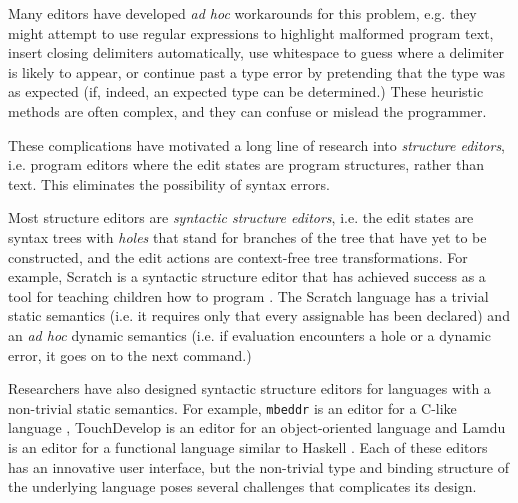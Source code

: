 Many editors have developed \emph{ad hoc} workarounds for this problem, e.g. they might attempt to use regular expressions to highlight malformed program text, insert closing delimiters automatically, use whitespace to guess where a delimiter is likely to appear, or continue past a type error by pretending that the type was as expected (if, indeed, an expected type can be determined.) These heuristic methods are often complex, and they can confuse or mislead the programmer. %


These complications have motivated a long line of research into \emph{structure editors}, i.e. program editors where the edit states are program structures, rather than text. This eliminates the possibility of syntax errors.

Most structure editors are \emph{syntactic structure editors}, i.e. the edit states are syntax trees with \emph{holes} that stand for branches of the tree that have yet to be constructed, and the edit actions are context-free tree transformations. For example, Scratch is a syntactic structure editor that has achieved success as a tool for teaching children how to program \cite{Resnick:2009:SP:1592761.1592779}. The Scratch language has a trivial static semantics (i.e. it requires only that every assignable has been declared) and an \emph{ad hoc} dynamic semantics (i.e. if evaluation encounters a hole or a dynamic error, it goes on to the next command.) 

Researchers have also designed syntactic structure editors for  languages with a non-trivial static semantics. For example, \texttt{mbeddr} is an editor for a C-like language \cite{voelter_mbeddr:_2012}, TouchDevelop is an editor for an object-oriented language \cite{tillmann_touchdevelop:_2011} and Lamdu is an editor for a functional language similar to Haskell \cite{lamdu}. Each of these editors has an innovative user interface, but the non-trivial type and binding structure of the underlying language poses several challenges that complicates its design. 


